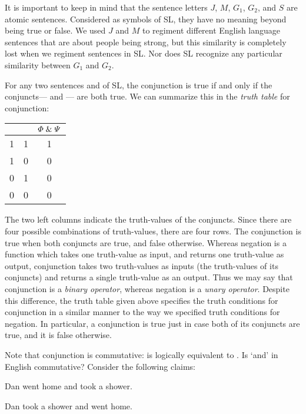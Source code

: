 It is important to keep in mind that the sentence letters $J$, $M$, $G_{1}$, $G_{2}$, and $S$ are atomic sentences.
Considered as symbols of SL, they have no meaning beyond being true or false.
We used $J$ and $M$ to regiment different English language sentences that are about people being strong, but this similarity is completely lost when we regiment sentences in SL.
Nor does SL recognize any particular similarity between $G_{1}$ and $G_{2}$.

For any two sentences \metaA{} and \metaB{} of SL, the conjunction \metaA{}\eand\metaB{} is true if and only if the conjuncts--- \metaA{} and \metaB{}--- are both true. We can summarize this in the \textit{truth table} for conjunction:
\begin{center}
\begin{tabular}{c|c|c}
\metaA{} & \metaB{} & $\varPhi{} \mathrel\& \varPsi{}$\\
\hline
1 & 1 & 1\\
1 & 0 & 0\\
0 & 1 & 0\\
0 & 0 & 0
\end{tabular}
\end{center}

The two left columns indicate the truth-values of the conjuncts.
Since there are four possible combinations of truth-values, there are four rows.
The conjunction is true when both conjuncts are true, and false otherwise.
Whereas negation is a function which takes one truth-value as input, and returns one truth-value as output, conjunction takes two truth-values as inputs (the truth-values of its conjuncts) and returns a single truth-value as an output. 
Thus we may say that conjunction is a \textit{binary operator}, whereas negation is a \textit{unary operator}.
Despite this difference, the truth table given above specifies the truth conditions for conjunction in a similar manner to the way we specified truth conditions for negation.
In particular, a conjunction is true just in case both of its conjuncts are true, and it is false otherwise.

Note that conjunction is commutative: \metaA{}\eand\metaB{} is logically equivalent to \metaB{}\eand\metaA{}.
Is `and' in English commutative?
Consider the following claims:

\begin{earg}
\item[\ex{and8}] Dan went home and took a shower.
\item[\ex{and9}] Dan took a shower and went home.
\end{earg}

